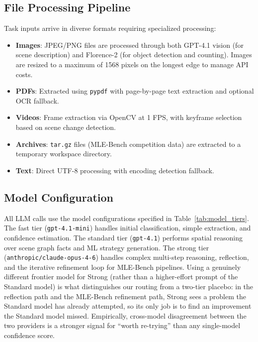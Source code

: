 \documentclass[11pt]{article}
\begin{document}
\subsection{File Processing Pipeline}

Task inputs arrive in diverse formats requiring specialized processing:

\begin{itemize}[leftmargin=*,itemsep=1pt]
  \item \textbf{Images}: JPEG/PNG files are processed through both GPT-4.1 vision (for scene description) and Florence-2 (for object detection and counting). Images are resized to a maximum of 1568 pixels on the longest edge to manage API costs.
  \item \textbf{PDFs}: Extracted using \texttt{pypdf} with page-by-page text extraction and optional OCR fallback.
  \item \textbf{Videos}: Frame extraction via OpenCV at 1 FPS, with keyframe selection based on scene change detection.
  \item \textbf{Archives}: \texttt{tar.gz} files (MLE-Bench competition data) are extracted to a temporary workspace directory.
  \item \textbf{Text}: Direct UTF-8 processing with encoding detection fallback.
\end{itemize}

\subsection{Model Configuration}

All LLM calls use the model configurations specified in Table~\ref{tab:model_tiers}. The fast tier (\texttt{gpt-4.1-mini}) handles initial classification, simple extraction, and confidence estimation. The standard tier (\texttt{gpt-4.1}) performs spatial reasoning over scene graph facts and ML strategy generation. The strong tier (\texttt{anthropic/\allowbreak claude-opus-4-6}) handles complex multi-step reasoning, reflection, and the iterative refinement loop for MLE-Bench pipelines. Using a genuinely different frontier model for Strong (rather than a higher-effort prompt of the Standard model) is what distinguishes our routing from a two-tier placebo: in the reflection path and the MLE-Bench refinement path, Strong sees a problem the Standard model has already attempted, so its only job is to find an improvement the Standard model missed. Empirically, cross-model disagreement between the two providers is a stronger signal for ``worth re-trying'' than any single-model confidence score.
\end{document}
